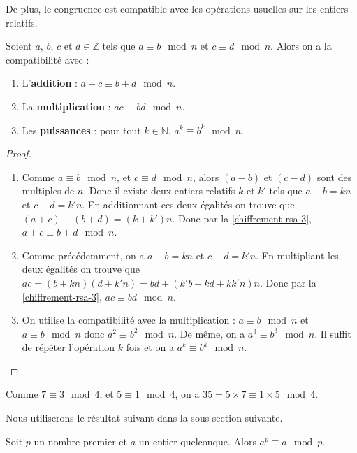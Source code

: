   De plus, le congruence est compatible avec les opérations usuelles sur les entiers relatifs.
  
  \begin{theorem}
    Soient $a$, $b$, $c$ et $d \in \mathbb{Z}$ tels que $a \equiv b \mod n$ et $c \equiv d \mod n$. Alors on a la compatibilité avec :
    \begin{enumerate}[label=(\roman*)]
      \item L'\textbf{addition} : $a + c \equiv b + d \mod n$.
      \item La \textbf{multiplication} : $ac \equiv bd \mod n$.
      \item Les \textbf{puissances} : pour tout $k \in \mathbb{N}$, $a^k \equiv b^k \mod n$.
    \end{enumerate}
  \end{theorem}
  
  \begin{proof}
    \begin{enumerate}[label=(\roman*)]
      \item Comme $a \equiv b \mod n$, et $c \equiv d \mod n$, alors $(a-b)$ et $(c-d)$ sont des multiples de $n$. Donc il existe deux entiers relatifs $k$ et $k'$ tels que $a-b = kn$ et $c-d = k'n$. En additionnant ces deux égalités on trouve que $(a+c) - (b+d) = (k+k')n$. Donc par la \cref{chiffrement-rsa-3}, $a + c \equiv b + d \mod n$.
      \item Comme précédemment, on a $a-b = kn$ et $c-d = k'n$. En multipliant les deux égalités on trouve que $ac = (b+kn)(d+k'n) = bd + (k'b + kd + kk'n)n$. Donc par la \cref{chiffrement-rsa-3}, $ac \equiv bd \mod n$.
      \item On utilise la compatibilité avec la multiplication : $a \equiv b \mod n$ et $a \equiv b \mod n$ donc $a^2 \equiv b^2 \mod n$. De même, on a $a^3 \equiv b^3 \mod n$. Il suffit de répéter l'opération $k$ fois et on a $a^k \equiv b^k \mod n$.
    \end{enumerate}
  \end{proof}
  
  \begin{example}
    Comme $7 \equiv 3 \mod 4$, et $5 \equiv 1 \mod 4$, on a $35 = 5 \times 7 \equiv 1 \times 5 \mod 4$.
  \end{example}
  
  Nous utiliserons le résultat suivant dans la sous-section suivante.
  
  \begin{theorem}
    \label{chiffrement-rsa-5}
    Soit $p$ un nombre premier et $a$ un entier quelconque. Alors $a^p \equiv a \mod p$.
  \end{theorem}
  
